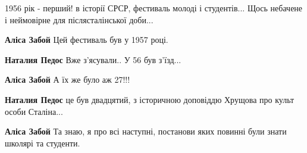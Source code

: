  
 
 
 
 

1956 рік - перший! в історії СРСР, фестиваль молоді і студентів... Щось
небачене і неймовірне для післясталінської доби...

\textbf{Аліса Забой} Цей фестиваль був у 1957 році.

\textbf{Наталия Педос} Вже з'ясували..
У 56 був з'їзд...

\textbf{Аліса Забой} А їх же було аж 27!!!

\textbf{Наталия Педос} це був двадцятий, з історичною доповіддю Хрущова про культ особи Сталіна...

\textbf{Аліса Забой} Та знаю, я про всі наступні, постанови яких повинні були знати школярі та студенти.
